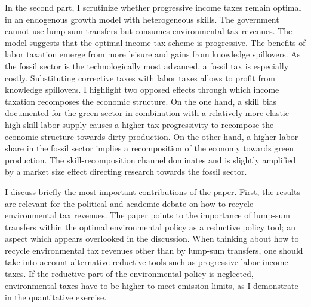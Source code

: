 In the second part, I scrutinize whether progressive income taxes remain optimal in an endogenous growth model with heterogeneous skills. The government cannot use lump-sum transfers but consumes environmental tax revenues.
 The model suggests that the optimal income tax scheme is progressive. The benefits of labor taxation emerge from more leisure and gains from knowledge spillovers. As the fossil sector is  the technologically most advanced, a fossil tax is especially costly. Substituting corrective taxes with labor taxes allows to profit from knowledge spillovers. I highlight two opposed effects through which income taxation recomposes the economic structure. On the one hand, a skill bias documented for the green sector \citep{Consoli2016DoCapital} in combination with a relatively more elastic high-skill labor supply causes a higher tax progressivity to recompose the economic structure towards dirty production. On the other hand, a higher labor share in the fossil sector implies a recomposition of the economy towards green production.
  The skill-recomposition channel dominates and is slightly amplified by a market size effect directing research towards the fossil sector. 
 
 

I discuss briefly the most important contributions of the paper.
First, the results are relevant for the political and academic debate on how  to recycle environmental tax revenues. The paper points to the importance of lump-sum transfers within the optimal environmental policy as a reductive policy tool; an aspect which appears overlooked in the discussion.%
When thinking about how to recycle environmental tax revenues other than by lump-sum transfers,  one should take into account alternative reductive tools such as progressive labor income taxes. 
If the reductive part of the environmental policy is neglected, environmental taxes have to be higher to meet emission limits, as I demonstrate in the quantitative exercise.

